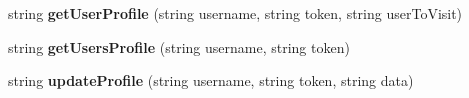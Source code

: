 \begin{DoxyCompactItemize}
\item 
\hypertarget{classServiceLayer_afe132fdef6f03f5f62caa525e4327100}{string {\bfseries get\-User\-Profile} (string username, string token, string user\-To\-Visit)}\label{classServiceLayer_afe132fdef6f03f5f62caa525e4327100}

\item 
\hypertarget{classServiceLayer_aa734255db70314f738b097b6c048c994}{string {\bfseries get\-Users\-Profile} (string username, string token)}\label{classServiceLayer_aa734255db70314f738b097b6c048c994}

\item 
\hypertarget{classServiceLayer_a927f11b4f38d260b83b3c4de67801d81}{string {\bfseries update\-Profile} (string username, string token, string data)}\label{classServiceLayer_a927f11b4f38d260b83b3c4de67801d81}

\end{DoxyCompactItemize}
